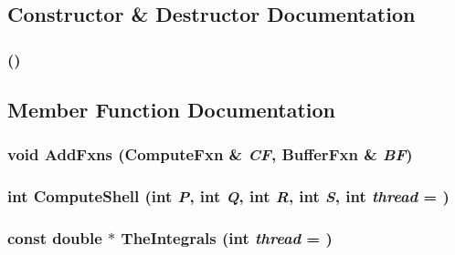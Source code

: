 \subsection{Constructor \& Destructor Documentation}
\hypertarget{classJKBuilder_1_1Integrals_ad62b2f3d89ff3b7777582513a89381f0}{
\subsubsection[{Integrals}]{ ()}}
\label{classJKBuilder_1_1Integrals_ad62b2f3d89ff3b7777582513a89381f0}


\subsection{Member Function Documentation}
\hypertarget{classJKBuilder_1_1Integrals_a192b23625f0ca29472adb24ea0167d04}{
\subsubsection[{AddFxns}]{\setlength{\rightskip}{0pt plus 5cm}void AddFxns ({\bf ComputeFxn} \& {\em CF}, \/  {\bf BufferFxn} \& {\em BF})}}
\label{classJKBuilder_1_1Integrals_a192b23625f0ca29472adb24ea0167d04}
\hypertarget{classJKBuilder_1_1Integrals_ac5087342e58e3fd449a58e82ea7e4b9c}{
\subsubsection[{ComputeShell}]{\setlength{\rightskip}{0pt plus 5cm}int ComputeShell (int {\em P}, \/  int {\em Q}, \/  int {\em R}, \/  int {\em S}, \/  int {\em thread} = {})}}
\label{classJKBuilder_1_1Integrals_ac5087342e58e3fd449a58e82ea7e4b9c}
\hypertarget{classJKBuilder_1_1Integrals_ad0720a0de5aa5cbe34ac5f4b80754ee7}{
\subsubsection[{TheIntegrals}]{\setlength{\rightskip}{0pt plus 5cm}const double $\ast$ TheIntegrals (int {\em thread} = {})}}
\label{classJKBuilder_1_1Integrals_ad0720a0de5aa5cbe34ac5f4b80754ee7}


